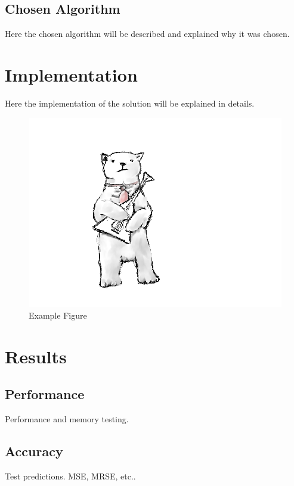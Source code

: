 \documentclass[
  twoside,
  11pt, a4paper,
  footinclude=true,
  headinclude=true,
  cleardoublepage=empty
]{scrreprt}
\begin{document}
        \section{Chosen Algorithm}
            Here the chosen algorithm will be described and explained why it was chosen.
         
    \chapter{Implementation}
        Here the implementation of the solution will be explained in details.
        \begin{figure}[h]
            \includegraphics[scale=0.5]{example.png}
            \centering
            \caption{Example Figure}
            \label{fig:example01}
        \end{figure}
        
        
    \chapter{Results}
        \section{Performance}
            Performance and memory testing.
        \section{Accuracy}
            Test predictions. MSE, MRSE, etc..
\end{document}
